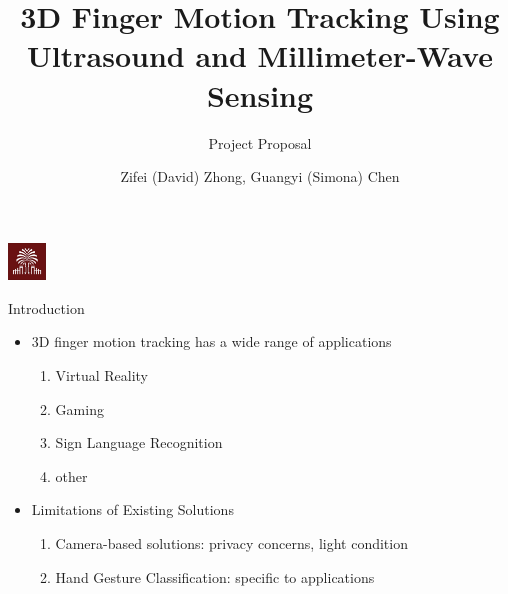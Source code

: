 \documentclass[dvipsnames, handout]{beamer}
\newcommand{\1}{\mathds{1}}	%
\begin{document}


\title{3D Finger Motion Tracking Using Ultrasound and Millimeter-Wave Sensing}
\subtitle{Project Proposal}
\author{Zifei (David) Zhong, Guangyi (Simona) Chen\vspace{-.3cm}}

\date{}
\begin{frame}
\titlepage
\vspace{-1.2cm}
\begin{center}
\includegraphics[width=1cm]{imgs/uofsc-logo.png}\bigskip
\end{center}
\end{frame}


\begin{frame}[t]{Introduction}

\begin{itemize}
\item 3D finger motion tracking has a wide range of applications
\begin{enumerate}
\item Virtual Reality
\item Gaming
\item Sign Language Recognition
\item other
\end{enumerate}

\item Limitations of Existing Solutions
\begin{enumerate}
\item Camera-based solutions: privacy concerns, light condition
\item Hand Gesture Classification: specific to applications
\end{enumerate}
\end{itemize}
\end{frame}
\end{document}
